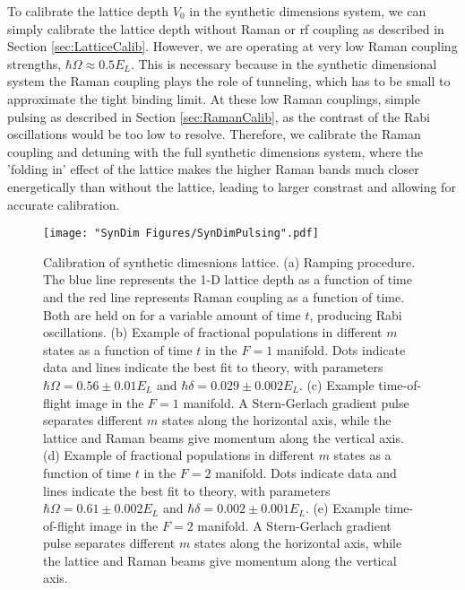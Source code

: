 To calibrate the lattice depth $V_0$ in the synthetic dimensions system, we can simply calibrate the lattice depth without Raman or rf coupling as described in Section \ref{sec:LatticeCalib}. However, we are operating at very low Raman coupling strengths, $\hbar\Omega\approx0.5 E_L$. This is necessary because in the synthetic dimensional system the Raman coupling plays the role of tunneling, which has to be small to approximate the tight binding limit. At these low Raman couplings, simple pulsing as described in Section \ref{sec:RamanCalib}, as the contrast of the Rabi oscillations would be too low to resolve. Therefore, we calibrate the Raman coupling and detuning with the full synthetic dimensions system, where the 'folding in' effect of the lattice makes the higher Raman bands much closer energetically than without the lattice, leading to larger constrast and allowing for accurate calibration.  

\begin{figure}
	\texttt{[image: "SynDim Figures/SynDimPulsing".pdf]}
\caption{Calibration of synthetic dimesnions lattice. (a) Ramping procedure. The blue line represents the 1-D lattice depth as a function of time and the red line represents Raman coupling as a function of time. Both are held on for a variable amount of time $t$, producing Rabi oscillations. (b) Example of fractional populations in different $m$ states as a function of time $t$ in the $F=1$ manifold. Dots indicate data and lines indicate the best fit to theory, with parameters $\hbar\Omega=0.56\pm0.01 E_L$ and $\hbar\delta = 0.029 \pm 0.002 E_L$. (c) Example time-of-flight image in the $F=1$ manifold. A Stern-Gerlach gradient pulse separates different $m$ states along the horizontal axis, while the lattice and Raman beams give momentum along the vertical axis. (d)  Example of fractional populations in different $m$ states as a function of time $t$ in the $F=2$ manifold. Dots indicate data and lines indicate the best fit to theory, with parameters $\hbar\Omega=0.61\pm0.002 E_L$ and $\hbar\delta = 0.002 \pm 0.001 E_L$. (e) Example time-of-flight image in the $F=2$ manifold. A Stern-Gerlach gradient pulse separates different $m$ states along the horizontal axis, while the lattice and Raman beams give momentum along the vertical axis.  }
\label{fig:SynDimPulsing}
\end{figure}

